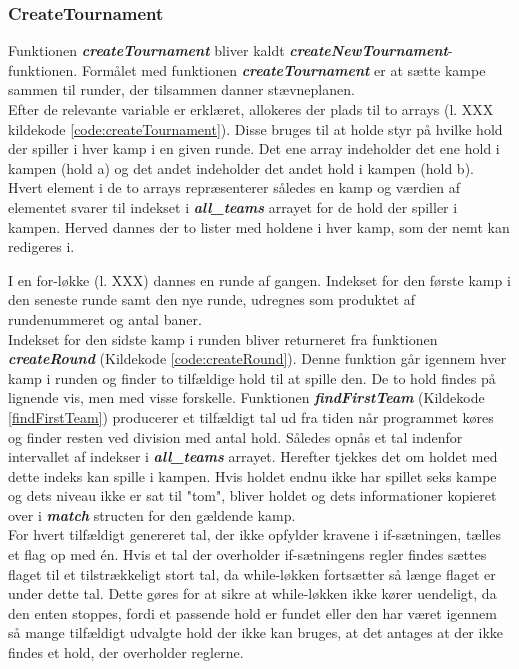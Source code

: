 \subsubsection{CreateTournament}
Funktionen \textbf{\textit{createTournament}} bliver kaldt \textbf{\textit{createNewTournament}}-funktionen.
Formålet med funktionen \textbf{\textit{createTournament}} er at sætte kampe sammen til runder, der tilsammen danner stævneplanen. \\
Efter de relevante variable er erklæret, allokeres der plads til to arrays (l. XXX kildekode \ref{code:createTournament}). Disse bruges til at holde styr på hvilke hold der spiller i hver kamp i en given runde. Det ene array indeholder det ene hold i kampen (hold a) og det andet indeholder det andet hold i kampen (hold b). Hvert element i de to arrays repræsenterer således en kamp og værdien af elementet svarer til indekset i \textbf{\textit{all\_teams}} arrayet for de hold der spiller i kampen. Herved dannes der to lister med holdene i hver kamp, som der nemt kan redigeres i.
\par
I en for-løkke (l. XXX) dannes en runde af gangen. Indekset for den første kamp i den seneste runde samt den nye runde, udregnes som produktet af rundenummeret og antal baner. \\
Indekset for den sidste kamp i runden bliver returneret fra funktionen \textbf{\textit{createRound}} (Kildekode \ref{code:createRound}). Denne funktion går igennem hver kamp i runden og finder to tilfældige hold til at spille den. De to hold findes på lignende vis, men med visse forskelle. Funktionen \textbf{\textit{findFirstTeam}} (Kildekode \ref{findFirstTeam}) producerer et tilfældigt tal ud fra tiden når programmet køres og finder resten ved division med antal hold. Således opnås et tal indenfor intervallet af indekser i \textbf{\textit{all\_teams}} arrayet. Herefter tjekkes det om holdet med dette indeks kan spille i kampen. Hvis holdet endnu ikke har spillet seks kampe og dets niveau ikke er sat til "tom", bliver holdet og dets informationer kopieret over i \textbf{\textit{match}} structen for den gældende kamp. \\
For hvert tilfældigt genereret tal, der ikke opfylder kravene i if-sætningen, tælles et flag op med én. Hvis et tal der overholder if-sætningens regler findes sættes flaget til et tilstrækkeligt stort tal, da while-løkken fortsætter så længe flaget er under dette tal. Dette gøres for at sikre at while-løkken ikke kører uendeligt, da den enten stoppes, fordi et passende hold er fundet eller den har været igennem så mange tilfældigt udvalgte hold der ikke kan bruges, at det antages at der ikke findes et hold, der overholder reglerne.\\
